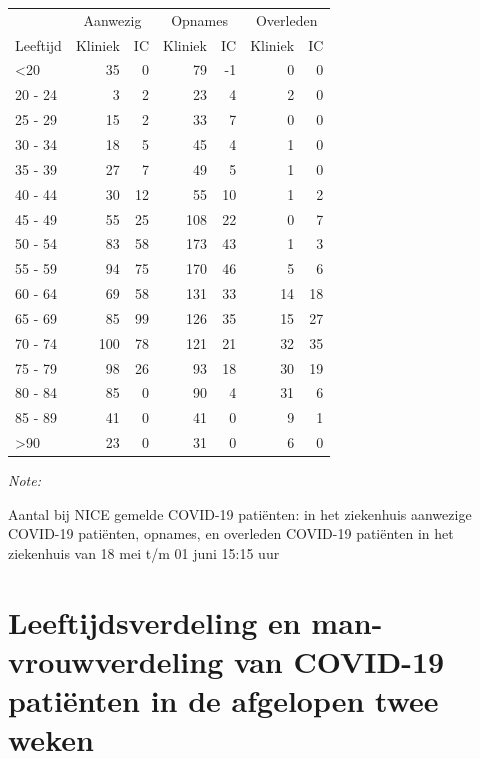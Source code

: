 \documentclass[
  english,
  man,floatsintext]{apa6}
\begin{document}
\begin{table}
\centering\begingroup\fontsize{10}{12}\selectfont

\begin{threeparttable}
\begin{tabular}{lrrrrrr}
\toprule
\multicolumn{1}{c}{ } & \multicolumn{2}{c}{Aanwezig} & \multicolumn{2}{c}{Opnames} & \multicolumn{2}{c}{Overleden} \\
\cmidrule(l{3pt}r{3pt}){2-3} \cmidrule(l{3pt}r{3pt}){4-5} \cmidrule(l{3pt}r{3pt}){6-7}
Leeftijd & Kliniek & IC & Kliniek & IC & Kliniek & IC\\
\midrule
<20 & 35 & 0 & 79 & -1 & 0 & 0\\
20 - 24 & 3 & 2 & 23 & 4 & 2 & 0\\
25 - 29 & 15 & 2 & 33 & 7 & 0 & 0\\
30 - 34 & 18 & 5 & 45 & 4 & 1 & 0\\
35 - 39 & 27 & 7 & 49 & 5 & 1 & 0\\
40 - 44 & 30 & 12 & 55 & 10 & 1 & 2\\
45 - 49 & 55 & 25 & 108 & 22 & 0 & 7\\
50 - 54 & 83 & 58 & 173 & 43 & 1 & 3\\
55 - 59 & 94 & 75 & 170 & 46 & 5 & 6\\
60 - 64 & 69 & 58 & 131 & 33 & 14 & 18\\
65 - 69 & 85 & 99 & 126 & 35 & 15 & 27\\
70 - 74 & 100 & 78 & 121 & 21 & 32 & 35\\
75 - 79 & 98 & 26 & 93 & 18 & 30 & 19\\
80 - 84 & 85 & 0 & 90 & 4 & 31 & 6\\
85 - 89 & 41 & 0 & 41 & 0 & 9 & 1\\
>90 & 23 & 0 & 31 & 0 & 6 & 0\\
\bottomrule
\end{tabular}
\begin{tablenotes}
\item \textit{Note: } 
\item Aantal bij NICE gemelde COVID-19 patiënten: in het ziekenhuis aanwezige COVID-19 patiënten, opnames, en overleden COVID-19 patiënten in het ziekenhuis van 18 mei t/m 01 juni 15:15 uur
\end{tablenotes}
\end{threeparttable}
\endgroup{}
\end{table}

\newpage

\hypertarget{leeftijdsverdeling-en-man-vrouwverdeling-van-covid-19-patiuxebnten-in-de-afgelopen-twee-weken}{%
\section{Leeftijdsverdeling en man-vrouwverdeling van COVID-19 patiënten in de afgelopen twee weken}\label{leeftijdsverdeling-en-man-vrouwverdeling-van-covid-19-patiuxebnten-in-de-afgelopen-twee-weken}}
\end{document}

